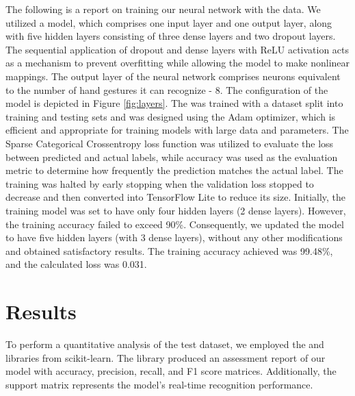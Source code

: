 The following is a report on training our neural network with the data. We utilized a model, which comprises one input layer and one output layer, along with five hidden layers consisting of three dense layers and two dropout layers. The sequential application of dropout and dense layers with ReLU activation acts as a mechanism to prevent overfitting while allowing the model to make nonlinear mappings. The output layer of the neural network comprises neurons equivalent to the number of hand gestures it can recognize - 8. The configuration of the model is depicted in Figure \ref{fig:layers}. The was trained with a dataset split into training and testing sets and was designed using the Adam optimizer, which is efficient and appropriate for training models with large data and parameters. The Sparse Categorical Crossentropy loss function was utilized to evaluate the loss between predicted and actual labels, while accuracy was used as the evaluation metric to determine how frequently the prediction matches the actual label. The training was halted by early stopping when the validation loss stopped to decrease and then converted into TensorFlow Lite to reduce its size. Initially, the training model was set to have only four hidden layers (2 dense layers). However, the training accuracy failed to exceed 90\%. Consequently, we updated the model to have five hidden layers (with 3 dense layers), without any other modifications and obtained satisfactory results. The training accuracy achieved was 99.48\%, and the calculated loss was 0.031.





\section{Results}

To perform a quantitative analysis of the test dataset, we employed the   and   libraries from scikit-learn. The  library produced an assessment report of our model with accuracy, precision, recall, and F1 score matrices. Additionally, the support matrix represents the model's real-time recognition performance.


